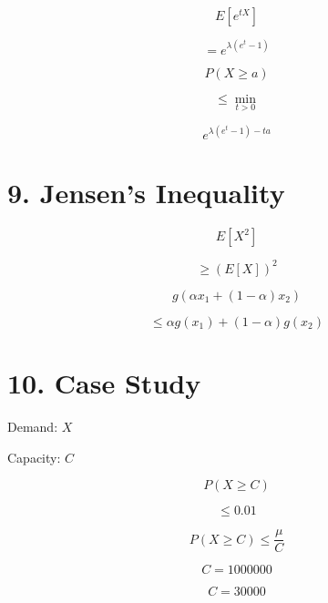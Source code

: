 \documentclass[12pt]{article}
\begin{document}
\[
E[e^{tX}]
\]

\vspace{0.5em}

\[
= e^{\lambda(e^t - 1)}
\]

\vspace{1em}

\[
P(X \geq a)
\]

\vspace{0.5em}

\[
\leq \min_{t>0}
\]

\vspace{0.5em}

\[
e^{\lambda(e^t -1) - ta}
\]

\vspace{2em}

\section*{9. Jensen’s Inequality}

\vspace{0.5em}

\[
E[X^2]
\]

\vspace{0.5em}

\[
\geq (E[X])^2
\]

\vspace{1em}

\[
g(\alpha x_1 + (1-\alpha)x_2)
\]

\vspace{0.5em}

\[
\leq \alpha g(x_1) + (1-\alpha) g(x_2)
\]

\vspace{2em}

\section*{10. Case Study}

\vspace{0.5em}

Demand: $X$

Capacity: $C$

\vspace{0.5em}

\[
P(X \geq C)
\]

\vspace{0.5em}

\[
\leq 0.01
\]

\vspace{1em}

\[
P(X \geq C) \leq \frac{\mu}{C}
\]

\vspace{0.5em}

\[
C = 1000000
\]

\vspace{1em}

\[
C = 30000
\]
\end{document}
